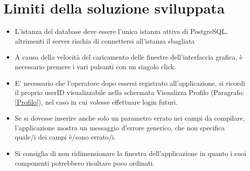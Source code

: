 \chapter{Limiti della soluzione sviluppata}
\begin{itemize}
	\item L'istanza del database deve essere l'unica istanza attiva di PostgreSQL, altrimenti il server rischia di connettersi all'istanza sbagliata
	\item A causa della velocità del caricamento delle finestre dell'interfaccia grafica, è necessario premere i vari pulsanti con un singolo click.
	\item E' necessario che l'operatore dopo essersi registrato all'applicazione, si ricordi il proprio userID visualizzabile nella schermata Visualizza Profilo (Paragrafo:\ref{Profilo}), nel caso in cui volesse effettuare login futuri.  
	\item Se si dovesse inserire anche solo un parametro errato nei campi da compilare, l'applicazione mostra un messaggio d'errore generico, che non specifica quale/i dei campi è/sono errato/i.
	\item Si consiglia di non ridimensionare la finestra dell'applicazione in quanto i suoi componenti potrebbero risultare poco ordinati.
\end{itemize}

\nocite{IuriTex}


